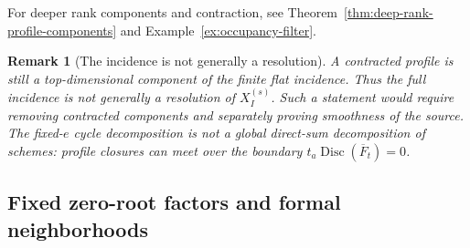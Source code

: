 \documentclass[10pt,fleqn]{article}
\numberwithin{equation}{section}
\newtheorem{remark}[theorem]{Remark}
\newcommand{\Disc}{\operatorname{Disc}}
\begin{document}
For deeper rank components and contraction, see
Theorem~\ref{thm:deep-rank-profile-components} and
Example~\ref{ex:occupancy-filter}.

\begin{remark}[The incidence is not generally a resolution]\label{rem:incidence-not-resolution}
A contracted profile is still a top-dimensional component of the
finite flat incidence.  Thus the full incidence is not generally a
resolution of $X_I^{(s)}$.  Such a statement would require removing
contracted components and separately proving smoothness of the source.
The fixed-$e$ cycle decomposition is not a global direct-sum
decomposition of schemes: profile closures can meet over the boundary
$t_a\Disc(\overline F_t)=0$.
\end{remark}


\subsection{Fixed zero-root factors and formal neighborhoods}
\label{r26:formal:local}
\end{document}
